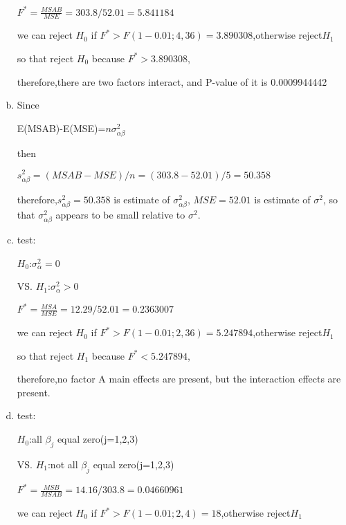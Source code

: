 \documentclass{article}\usepackage[]{graphicx}\usepackage[]{color}
\begin{document}
\begin{enumerate}[(a)]
\begin{center}
$F^*=\frac{MSAB}{MSE} = 303.8/52.01 = 5.841184$

we can reject $H_0$ if $F^* > F(1-0.01;4,36)=3.890308$,otherwise reject$H_1$

so that reject $H_0$ because $F^*>3.890308$,

therefore,there are two factors interact, and P-value of it is 0.0009944442
\end{center}

\item

Since

\begin{center}
E(MSAB)-E(MSE)=$n\sigma_{\alpha\beta}^2$
\end{center}

then

\begin{center}
$s_{\alpha\beta}^2 = (MSAB-MSE)/n = (303.8 -52.01)/5 = 50.358$
\end{center}

therefore,$s_{\alpha\beta}^2=50.358$ is estimate of $\sigma_{\alpha\beta}^2$, $MSE=52.01$ is estimate of $\sigma^2$, so that  $\sigma_{\alpha\beta}^2$ appears to be small relative to $\sigma^2$.

\item

test:

\begin{center}
$H_0$:$\sigma_{\alpha}^2=0$

VS. $H_1$:$\sigma_{\alpha}^2>0$

$F^*=\frac{MSA}{MSE} = 12.29/52.01 = 0.2363007$

we can reject $H_0$ if $F^* > F(1-0.01;2,36)=5.247894$,otherwise reject$H_1$

so that reject $H_1$ because $F^*<5.247894$,

therefore,no factor A main effects are present, but the interaction effects are present.
\end{center}

\item

test:

\begin{center}
$H_0$:all $\beta_j$ equal zero(j=1,2,3)

VS. $H_1$:not all $\beta_j$ equal zero(j=1,2,3)

$F^*=\frac{MSB}{MSAB} = 14.16/303.8  = 0.04660961$

we can reject $H_0$ if $F^* > F(1-0.01;2,4)=18$,otherwise reject$H_1$


\end{center}
\end{enumerate}
\end{document}
